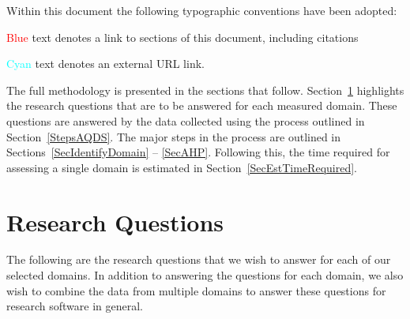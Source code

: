 \documentclass[letterpaper,cleveref]{lipics-v2019}
\begin{document}
Within this document the following typographic conventions have been adopted:
\begin{inparaenum}[i)] 
  \item \textcolor{red}{Blue} text denotes a link to sections of this document,
  including citations 
  \item \textcolor{cyan}{Cyan} text denotes an external URL link.
\end{inparaenum}

The full methodology is presented in the sections that follow.
Section~\ref{SecResearchQuestions} highlights the research questions that are to
be answered for each measured domain. These questions are answered by the data
collected using the process outlined in Section~\ref{StepsAQDS}.  The major
steps in the process are outlined in Sections~\ref{SecIdentifyDomain} --
\ref{SecAHP}.  Following this, the time required for assessing a single domain
is estimated in Section~\ref{SecEstTimeRequired}.

\section{Research Questions} \label{SecResearchQuestions}

The following are the research questions that we wish to answer for each of our
selected domains.  In addition to answering the questions for each domain, we
also wish to combine the data from multiple domains to answer these questions
for research software in general.
\end{document}
